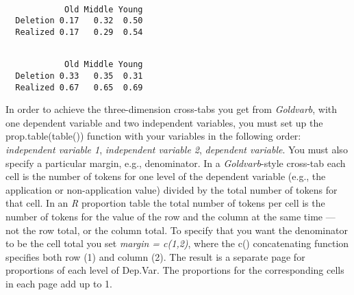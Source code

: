 \documentclass[
  12pt,
  letterpaper]{article}
\newenvironment{Shaded}{\begin{snugshade}}{\end{snugshade}}
\newcommand{\AttributeTok}[1]{\textcolor[rgb]{0.40,0.45,0.13}{#1}}
\newcommand{\CommentTok}[1]{\textcolor[rgb]{0.37,0.37,0.37}{#1}}
\newcommand{\DecValTok}[1]{\textcolor[rgb]{0.68,0.00,0.00}{#1}}
\newcommand{\FunctionTok}[1]{\textcolor[rgb]{0.28,0.35,0.67}{#1}}
\newcommand{\NormalTok}[1]{\textcolor[rgb]{0.00,0.23,0.31}{#1}}
\newcommand{\SpecialCharTok}[1]{\textcolor[rgb]{0.37,0.37,0.37}{#1}}
\renewcommand\texttt[1]{{\ttfamily\color{BrickRed}#1}}
\begin{document}
\begin{Shaded}
\end{Shaded}

\begin{verbatim}
          
            Old Middle Young
  Deletion 0.17   0.32  0.50
  Realized 0.17   0.29  0.54
\end{verbatim}

\begin{Shaded}
\end{Shaded}

\begin{verbatim}
          
            Old Middle Young
  Deletion 0.33   0.35  0.31
  Realized 0.67   0.65  0.69
\end{verbatim}

In order to achieve the three-dimension cross-tabs you get from
\emph{Goldvarb}, with one dependent variable and two independent
variables, you must set up the \texttt{prop.table(table())} function
with your variables in the following order: \emph{independent variable
1}, \emph{independent variable 2}, \emph{dependent variable}. You must
also specify a particular \texttt{margin}, e.g., denominator. In a
\emph{Goldvarb}-style cross-tab each cell is the number of tokens for
one level of the dependent variable (e.g., the application or
non-application value) divided by the total number of tokens for that
cell. In an \emph{R} proportion table the total number of tokens per
cell is the number of tokens for the value of the row and the column at
the same time --- not the row total, or the column total. To specify
that you want the denominator to be the cell total you set \emph{margin
= c(1,2)}, where the \texttt{c()} concatenating function specifies both
row (1) and column (2). The result is a separate page for proportions of
each level of \texttt{Dep.Var}. The proportions for the corresponding
cells in each page add up to 1.
\end{document}
